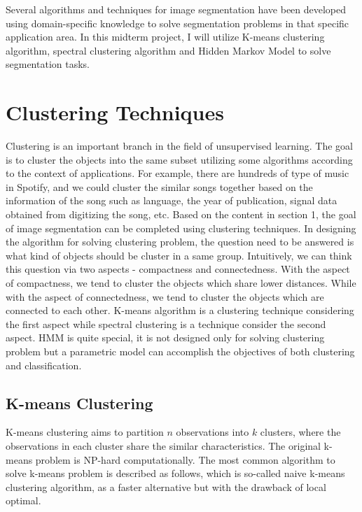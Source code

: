 \documentclass[a4paper]{article}
\begin{document}
Several algorithms and techniques for image segmentation have been developed using domain-specific knowledge to solve segmentation problems in that specific application area. In this midterm project, I will utilize K-means clustering algorithm, spectral clustering algorithm and Hidden Markov Model to solve segmentation tasks.

\section{Clustering Techniques}

Clustering is an important branch in the field of unsupervised learning. The goal is to cluster the objects into the same subset utilizing some algorithms according to the context of applications. For example, there are hundreds of type of music in Spotify, and we could cluster the similar songs together based on the information of the song such as language, the year of publication, signal data obtained from digitizing the song, etc. Based on the content in section 1, the goal of image segmentation can be completed using clustering techniques. In designing the algorithm for solving clustering problem, the question need to be answered is what kind of objects should be cluster in a same group. Intuitively, we can think this question via two aspects - compactness and connectedness. With the aspect of compactness, we tend to cluster the objects which share lower distances. While with the aspect of connectedness, we tend to cluster the objects which are connected to each other. K-means algorithm is a clustering technique considering the first aspect while spectral clustering is a technique consider the second aspect. HMM is quite special, it is not designed only for solving clustering problem but a parametric model can accomplish the objectives of both clustering and classification.
\subsection{K-means Clustering}

K-means clustering aims to partition $n$ observations into $k$ clusters, where the observations in each cluster share the similar characteristics. The original k-means problem is NP-hard computationally. The most common algorithm to solve k-means problem is described as follows, which is so-called naive k-means clustering algorithm, as a faster alternative but with the drawback of local optimal.

\
\end{document}

